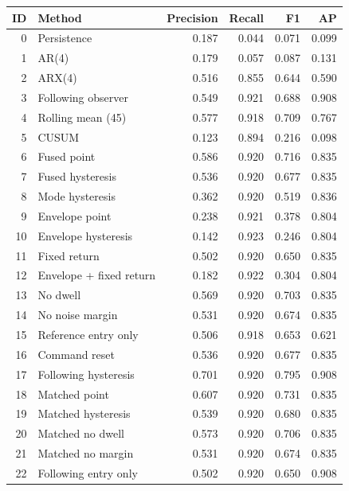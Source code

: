 \begin{tabular}{rlrrrr}
\toprule
ID & Method & Precision & Recall & F1 & AP \\
\midrule
0 & Persistence & 0.187 & 0.044 & 0.071 & 0.099 \\
1 & AR(4) & 0.179 & 0.057 & 0.087 & 0.131 \\
2 & ARX(4) & 0.516 & 0.855 & 0.644 & 0.590 \\
3 & Following observer & 0.549 & 0.921 & 0.688 & 0.908 \\
4 & Rolling mean (45) & 0.577 & 0.918 & 0.709 & 0.767 \\
5 & CUSUM & 0.123 & 0.894 & 0.216 & 0.098 \\
6 & Fused point & 0.586 & 0.920 & 0.716 & 0.835 \\
7 & Fused hysteresis & 0.536 & 0.920 & 0.677 & 0.835 \\
8 & Mode hysteresis & 0.362 & 0.920 & 0.519 & 0.836 \\
9 & Envelope point & 0.238 & 0.921 & 0.378 & 0.804 \\
10 & Envelope hysteresis & 0.142 & 0.923 & 0.246 & 0.804 \\
11 & Fixed return & 0.502 & 0.920 & 0.650 & 0.835 \\
12 & Envelope + fixed return & 0.182 & 0.922 & 0.304 & 0.804 \\
13 & No dwell & 0.569 & 0.920 & 0.703 & 0.835 \\
14 & No noise margin & 0.531 & 0.920 & 0.674 & 0.835 \\
15 & Reference entry only & 0.506 & 0.918 & 0.653 & 0.621 \\
16 & Command reset & 0.536 & 0.920 & 0.677 & 0.835 \\
17 & Following hysteresis & 0.701 & 0.920 & 0.795 & 0.908 \\
18 & Matched point & 0.607 & 0.920 & 0.731 & 0.835 \\
19 & Matched hysteresis & 0.539 & 0.920 & 0.680 & 0.835 \\
20 & Matched no dwell & 0.573 & 0.920 & 0.706 & 0.835 \\
21 & Matched no margin & 0.531 & 0.920 & 0.674 & 0.835 \\
22 & Following entry only & 0.502 & 0.920 & 0.650 & 0.908 \\
\bottomrule
\end{tabular}

